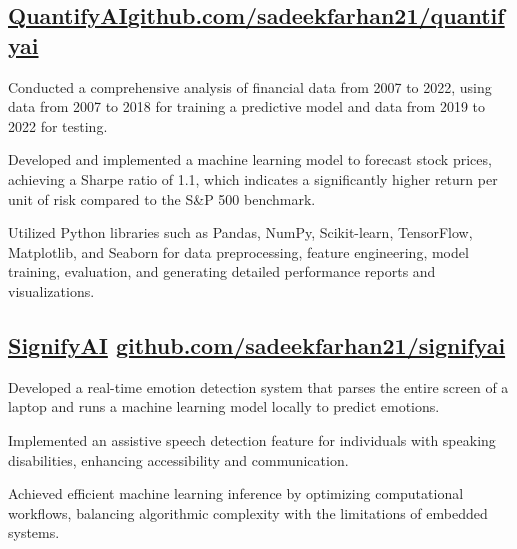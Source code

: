 \documentclass[]{Farhan_Resume_Class}
\begin{document}
\begin{minipage}[t]{0.70\textwidth}
    \subsection{\href{https://github.com/SadeekFarhan21/QuantifyAI/}{QuantifyAI}\hfill \href{https://github.com/SadeekFarhan21/Quantathon/}{\lowercase{github.com/SadeekFarhan21/QuantifyAI}}}
    \begin{tightemize}     \vspace{10pt}
    \item Conducted a comprehensive analysis of financial data from 2007 to 2022, using data from 2007 to 2018 for training a predictive model and data from 2019 to 2022 for testing.
    \item Developed and implemented a machine learning model to forecast stock prices, achieving a Sharpe ratio of 1.1, which indicates a significantly higher return per unit of risk compared to the S\&P 500 benchmark.
    \item Utilized Python libraries such as Pandas, NumPy, Scikit-learn, TensorFlow, Matplotlib, and Seaborn for data preprocessing, feature engineering, model training, evaluation, and generating detailed performance reports and visualizations.
    \end{tightemize}

    \subsection{\href{https://github.com/SadeekFarhan21/SignifyAI}{SignifyAI} \hfill \href{https://github.com/SadeekFarhan21/SignifyAI/}{\lowercase{github.com/SadeekFarhan21/SignifyAI}}}
    \begin{tightemize}
        \vspace{10pt}
        \item Developed a real-time emotion detection system that parses the entire screen of a laptop and runs a machine learning model locally to predict emotions.
        \item Implemented an assistive speech detection feature for individuals with speaking disabilities, enhancing accessibility and communication.
        \item Achieved efficient machine learning inference by optimizing computational workflows, balancing algorithmic complexity with the limitations of embedded systems.
    \end{tightemize}


\end{minipage}
\end{document}
